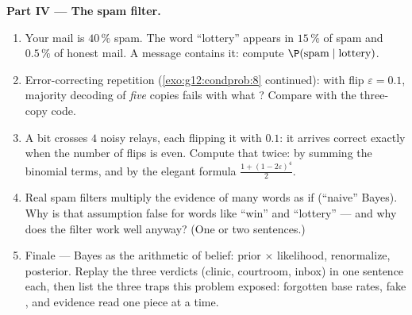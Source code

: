 \begin{problem}
\medskip
\noindent\textbf{Part IV --- The spam filter.}
\begin{enumerate}[resume]
  \item Your mail is $40\,\%$ spam. The word ``lottery''
        appears in $15\,\%$ of spam and $0.5\,\%$ of honest
        mail. A message contains it: compute
        $\P(\text{spam} \mid \text{lottery})$.
  \item Error-correcting repetition
        (\cref{exo:g12:condprob:8} continued): with flip
         $\varepsilon = 0.1$, majority decoding of
        \emph{five} copies fails with what ?
        Compare with the three-copy code.
  \item A bit crosses $4$  noisy relays, each
        flipping it with  $0.1$: it arrives correct
        exactly when the number of flips is even. Compute that
         twice: by summing the binomial terms, and
        by the elegant formula
        $\frac{1 + (1 - 2\varepsilon)^4}{2}$.
  \item Real spam filters multiply the evidence of many words
        as if  (``naive'' Bayes). Why is that
        assumption false for words like ``win'' and
        ``lottery'' --- and why does the filter work well
        anyway? (One or two sentences.)
  \item Finale --- Bayes as the arithmetic of belief: prior
        $\times$ likelihood, renormalize, posterior. Replay the
        three verdicts (clinic, courtroom, inbox) in one
        sentence each, then list the three traps this problem
        exposed: forgotten base rates, fake , and
        evidence read one piece at a time.
\end{enumerate}
\end{problem}
